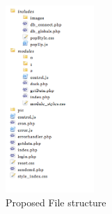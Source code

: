 \begin{figure}[H]
	\begin{centering}
		\includegraphics[width=0.3\textwidth]{images/file_structure.png}
		\caption{Proposed File structure}
	\end{centering}
\end{figure}


